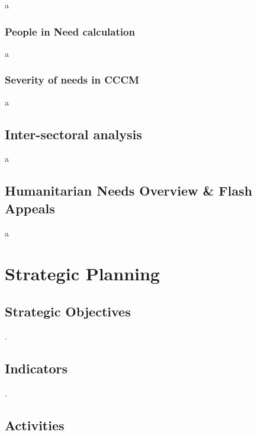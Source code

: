 \documentclass[
  a4paper,
  onecolumn,
  oneside]{book}
\begin{document}
a

\hypertarget{people-in-need-calculation}{%
\subsection{People in Need
calculation}\label{people-in-need-calculation}}

a

\hypertarget{severity-of-needs-in-cccm}{%
\subsection{Severity of needs in CCCM}\label{severity-of-needs-in-cccm}}

a

\hypertarget{inter-sectoral-analysis}{%
\section{Inter-sectoral analysis}\label{inter-sectoral-analysis}}

a

\hypertarget{humanitarian-needs-overview-flash-appeals}{%
\section{Humanitarian Needs Overview \& Flash
Appeals}\label{humanitarian-needs-overview-flash-appeals}}

a

\hypertarget{strategic-planning}{%
\chapter{Strategic Planning}\label{strategic-planning}}

\hypertarget{strategic-objectives}{%
\section{Strategic Objectives}\label{strategic-objectives}}

.

\hypertarget{indicators-1}{%
\section{Indicators}\label{indicators-1}}

.

\hypertarget{activities-1}{%
\section{Activities}\label{activities-1}}
\end{document}
